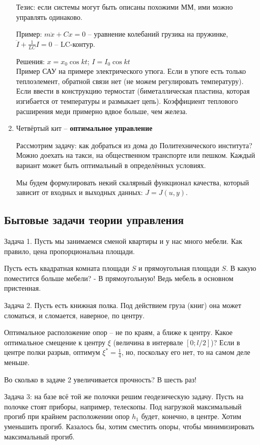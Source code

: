 \documentclass[main.tex]{subfiles}
\begin{document}
\begin{enumerate}
	Тезис: если системы могут быть описаны похожими ММ, ими можно управлять одинаково.

	Пример: $ m\ddot{x} + Cx = 0 $ -- уравнение колебаний грузика на пружинке, $ \ddot I + \frac{1}{LC}I = 0 $ -- LC-контур.

	Решения: $ x = x_0 \cos kt $; $ I = I_0 \cos kt $ \\


	Пример САУ на примере электрического утюга. Если в утюге есть только теплоэлемент, обратной связи нет (не можем регулировать температуру).
	Если ввести в конструкцию термостат (биметаллическая пластина, которая изгибается от температуры и размыкает цепь). Коэффициент теплового расширения меди примерно вдвое больше, чем железа.

	\item Четвёртый кит -- \textbf{оптимальное управление}

	Рассмотрим задачу: как добраться из дома до Политехнического института?
	Можно доехать на такси, на общественном транспорте или пешком.
	Каждый вариант может быть оптимальный в определённых условиях.

	Мы будем формулировать некий скалярный функционал качества, который зависит от входных и выходных данных: $ J = J(u, y) $.

\end{enumerate}

\subsection{Бытовые задачи теории управления}

Задача 1. Пусть мы занимаемся сменой квартиры и у нас много мебели. Как правило, цена пропорциональна площади.

Пусть есть квадратная комната площади $ S $ и прямоугольная площади $ S $.
В какую поместится больше мебели? - В прямоугольную! Ведь мебель в основном пристенная.

Задача 2. Пусть есть книжная полка. Под действием груза (книг) она может сломаться, и сломается, наверное, по центру.

Оптимальное расположение опор -- не по краям, а ближе к центру. Какое оптимальное смещение к центру $ \xi $ (величина в интервале $ [0; l/2] $)? Если в центре полки разрыв, оптимум $ \xi^* = \frac{1}{4} $, но, поскольку его нет, то на самом деле меньше.

Во сколько в задаче 2 увеличивается прочность? В шесть раз!

Задача 3: на базе всё той же полочки решим геодезическую задачу.
Пусть на полочке стоят приборы, например, телескопы.
Под нагрузкой максимальный прогиб при крайнем расположении опор $ h_1 $ будет, конечно, в центре.
Хотим уменьшить прогиб.
Казалось бы, хотим сместить опоры, чтобы минимизировать максимальный прогиб.
\end{document}
